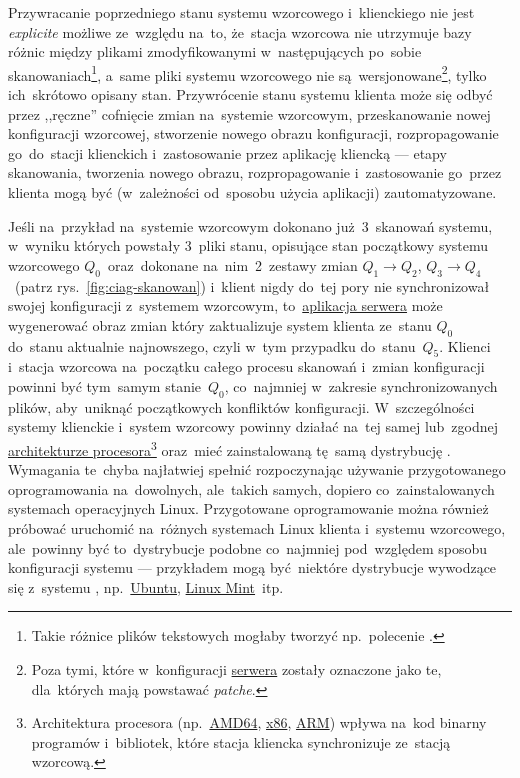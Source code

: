 \documentclass[thesis]{subfiles}
\begin{document}
Przywracanie poprzedniego stanu systemu wzorcowego i~klienckiego nie jest \emph{explicite} możliwe ze~względu na~to, że~stacja wzorcowa nie utrzymuje bazy różnic między plikami zmodyfikowanymi w~następujących po~sobie skanowaniach\footnote{Takie różnice plików tekstowych mogłaby tworzyć np.~polecenie .}, a~same pliki systemu wzorcowego nie są~wersjonowane\footnote{Poza tymi, które w~konfiguracji \hyperref[sec:srv-app]{serwera} zostały oznaczone jako te, dla~których mają powstawać \emph{patche}.}, tylko ich~skrótowo opisany stan. Przywrócenie stanu systemu klienta może się odbyć przez ,,ręczne'' cofnięcie zmian na~systemie wzorcowym, przeskanowanie nowej konfiguracji wzorcowej, stworzenie nowego obrazu konfiguracji, rozpropagowanie go~do~stacji klienckich i~zastosowanie przez aplikację kliencką --- etapy skanowania, tworzenia nowego obrazu, rozpropagowanie i~zastosowanie go~przez klienta mogą być (w~zależności od~sposobu użycia aplikacji) zautomatyzowane.

Jeśli na~przykład na~systemie wzorcowym dokonano już~3~skanowań systemu, w~wyniku których powstały 3~pliki stanu, opisujące stan początkowy systemu wzorcowego $Q_0$~oraz~dokonane na~nim~2~zestawy zmian $Q_1\rightarrow Q_2$, $Q_3\rightarrow Q_4$~(patrz rys.~\ref{fig:ciag-skanowan}) i~klient nigdy do~tej pory nie synchronizował swojej konfiguracji z~systemem wzorcowym, to~\hyperref[sec:srv-app]{aplikacja serwera} może wygenerować obraz zmian który zaktualizuje system klienta ze~stanu $Q_0$ do~stanu aktualnie najnowszego, czyli w~tym przypadku do~stanu~$Q_5$. Klienci i~stacja wzorcowa na~początku całego procesu skanowań i~zmian konfiguracji powinni być tym~samym stanie~$Q_0$, co~najmniej w~zakresie synchronizowanych plików, aby~uniknąć początkowych konfliktów konfiguracji. W~szczególności systemy klienckie i~system wzorcowy powinny działać na~tej samej lub~zgodnej \href{https://en.wikipedia.org/wiki/List_of_instruction_sets}{architekturze procesora}\footnote{Architektura procesora (np.~\href{https://en.wikipedia.org/wiki/X86-64}{AMD64}, \href{https://en.wikipedia.org/wiki/X86}{x86}, \href{https://en.wikipedia.org/wiki/ARM_architecture}{ARM}) wpływa na~kod binarny programów i~bibliotek, które stacja kliencka synchronizuje ze~stacją wzorcową.} oraz~mieć zainstalowaną tę~samą dystrybucję . Wymagania te~chyba najłatwiej spełnić rozpoczynając używanie przygotowanego oprogramowania na~dowolnych, ale~takich samych, dopiero co~zainstalowanych systemach operacyjnych Linux. Przygotowane oprogramowanie można również próbować uruchomić na~różnych systemach Linux klienta i~systemu wzorcowego, ale~powinny być to~dystrybucje podobne co~najmniej pod~względem sposobu konfiguracji systemu --- przykładem mogą być~niektóre dystrybucje wywodzące się z~systemu \debian{}, np.~\href{https://en.wikipedia.org/wiki/Ubuntu_(operating_system)}{Ubuntu}, \href{https://en.wikipedia.org/wiki/Linux_Mint}{Linux Mint}~itp.
\end{document}
